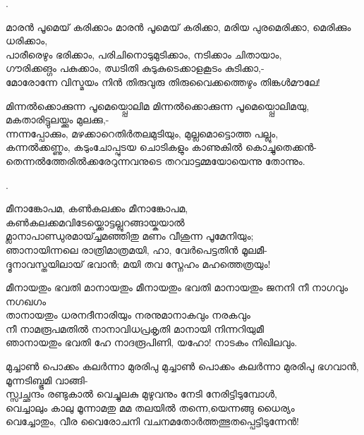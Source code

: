 \begin{enumerate}

.


\begin{slokam}{\VSr}{\Unk}{മാരൻ പൂമെയ്‌ കരിക്കാം}
 മാരൻ പൂമെയ്‌ കരിക്കാ, മരിയ പുരമെരിക്കാ, മെരിക്കും ധരിക്കാം,\\
പാരീരെഴും ഭരിക്കാം, പരിചിനൊടുമുടിക്കാം, നടിക്കാം ചിതായാം,\\
ഗൗരിക്കങ്ഗം പകുക്കാം, ഝടിതി കുടുകുടെക്കാളകൂടം കുടിക്കാ,-\\
മോരോന്നേ വിസ്മയം നിൻ തിരുവുരു തിരുവൈക്കത്തെഴും തിങ്കള്‍മൗലേ!
\end{slokam}



\begin{slokam}{\VSr}{\OKM}{മിന്നൽക്കൊക്കുന്ന പൂമെയ്പ്പൊലിമ}
മിന്നൽക്കൊക്കുന്ന പൂമെയ്പ്പൊലിമയു, മകതാരിട്ടുലയ്ക്കും മുലക്കു,-\\
ന്നന്നപ്പോക്കും, മഴക്കാറെതിർതലമുടിയും, മുല്ലമൊട്ടൊത്ത പല്ലും,\\
കന്നൽക്കണ്ണും, കടുംചോപ്പുടയ ചൊടികളും കാണുകിൽ കൊച്ചുതെക്കൻ-\\
തെന്നൽത്തേരിൽക്കരേറുന്നവനുടെ തറവാട്ടമ്മയോയെന്നു തോന്നും.
\end{slokam}


.

\begin{slokam}{\VSv}{\VNM}{മീനാങ്കോപമ, കൺകലക്കം}
മീനാങ്കോപമ, കൺകലക്കമവിടേയ്ക്കൊട്ടല്ലുറങ്ങായ്കയാൽ\\
മ്ലാനാപാണ്ഡുരമായ്ച്ചമഞ്ഞിതു മണം വീശുന്ന പൂമേനിയും;\\
ഞാനായിന്നലെ രാത്രിമാത്രമയി, ഹാ, വേർപെട്ടതിൻ മൂലമീ-\\
ദ്ദൂനാവസ്തയിലായ്‌ ഭവാൻ; മയി തവ സ്നേഹം മഹത്തെത്രയും!
\end{slokam}


\begin{slokam}{\VMt}{\SNG}{മീനായതും ഭവതി മാനായതും}
 മീനായതും ഭവതി മാനായതും ജനനി നീ നാഗവും നഗഖഗം\\
താനായതും ധരനദീനാരിയും നരനുമാനാകവും നരകവും\\
നീ നാമരൂപമതിൽ നാനാവിധപ്രകൃതി മാനായി നിന്നറിയുമീ\\
ഞാനായതും ഭവതി ഹേ നാദരൂപിണി, യഹോ! നാടകം നിഖിലവും.
\end{slokam}


\begin{slokam}{\VSr}{\KKT}{മുച്ചാണ്‍ പൊക്കം കലര്‍ന്നാ മുരരിപു}
മുച്ചാണ്‍ പൊക്കം കലര്‍ന്നാ മുരരിപു ഭഗവാന്‍, മൂന്നടിബ്ഭൂമി വാങ്ങി-\\
സ്സ്വച്ഛന്ദം രണ്ടുകാല്‍ വെച്ചുലകു മുഴുവനും നേടി നേരിട്ടിടുമ്പോള്‍,\\
വെച്ചാലും കാലു മൂന്നാമതു മമ തലയില്‍ തന്നെ,യെന്നങ്ങു ധൈര്യം\\
വെച്ചോതും, വീര വൈരോചനി വചനമതോര്‍ത്തത്ഭുതപ്പെട്ടിടുന്നേന്‍! 
\end{slokam}


\end{enumerate}
